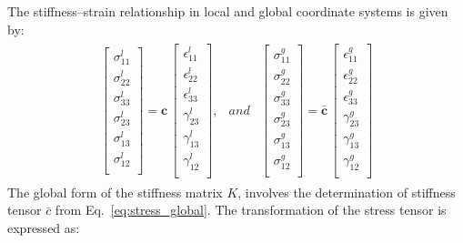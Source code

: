 \documentclass[a4paper,fleqn]{cas-sc}
\begin{document}
The stiffness--strain relationship in local and global coordinate systems is given by:
\begin{eqnarray}
	\begin{array}{ccc}
		\left [
		\begin{array}{c}
			\sigma^l_{11}\\
			\sigma^l_{22}\\ 
			\sigma^l_{33}\\ 
			\sigma^l_{23}\\
			\sigma^l_{13}\\
			\sigma^l_{12}\\
		\end{array}
		\right ]=
		\textbf{c}\,\left [
		\begin{array}{c}
			\epsilon^l_{11}\\
			\epsilon^l_{22}\\ 
			\epsilon^l_{33}\\
			\gamma^l_{23}\\
			\gamma^l_{13}\\
			\gamma^l_{12}\\
		\end{array}
		\right ], & and &
		\left [
		\begin{array}{c}
			\sigma^g_{11}\\
			\sigma^g_{22}\\ 
			\sigma^g_{33}\\ 
			\sigma^g_{23}\\
			\sigma^g_{13}\\
			\sigma^g_{12}\\
		\end{array}
		\right ]=
		\bar{\textbf{c}}\,\left [
		\begin{array}{c}
			\epsilon^g_{11}\\
			\epsilon^g_{22}\\ 
			\epsilon^g_{33}\\
			\gamma^g_{23}\\
			\gamma^g_{13}\\
			\gamma^g_{12}\\
		\end{array}
		\right ]
	\end{array}
	\label{eq:stress_global}
\end{eqnarray}
The global form of the stiffness matrix \(K\), involves the determination of stiffness tensor \(\bar{c}\) from Eq.~\ref{eq:stress_global}.
The transformation of the stress tensor is expressed as:
\end{document}
